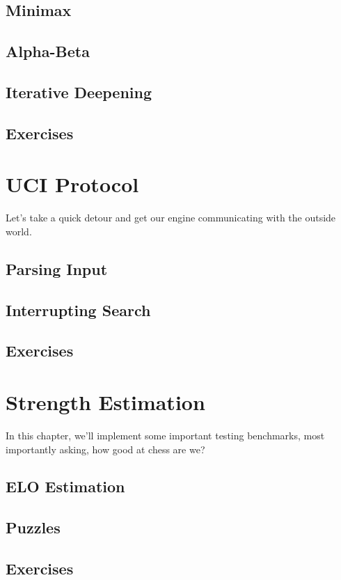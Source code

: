 \documentclass[letterpaper,11pt]{article}
\begin{document}
\subsection{Minimax}
\subsection{Alpha-Beta}
\subsection{Iterative Deepening}
\subsection{Exercises}

\section{UCI Protocol}

Let's take a quick detour and get our engine communicating with the outside world.

\subsection{Parsing Input}
\subsection{Interrupting Search}
\subsection{Exercises}

\section{Strength Estimation}

In this chapter, we'll implement some important testing benchmarks, most importantly asking,
how good at chess are we?

\subsection{ELO Estimation}
\subsection{Puzzles}
\subsection{Exercises}
\end{document}
